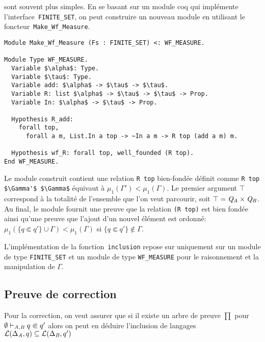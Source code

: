 sont souvent plus simples.
En se basant sur un module coq qui implémente l'interface~\lstinline!FINITE_SET!, on peut construire un nouveau module
en utilisant le foncteur~\lstinline!Make_Wf_Measure!.
\begin{lstlisting}
Module Make_Wf_Measure (Fs : FINITE_SET) <: WF_MEASURE.

Module Type WF_MEASURE.
  Variable $\alpha$: Type.
  Variable $\tau$: Type.
  Variable add: $\alpha$ -> $\tau$ -> $\tau$.
  Variable R: list $\alpha$ -> $\tau$ -> $\tau$ -> Prop.
  Variable In: $\alpha$ -> $\tau$ -> Prop.

  Hypothesis R_add:
    forall top,
      forall a m, List.In a top -> ~In a m -> R top (add a m) m.

  Hypothesis wf_R: forall top, well_founded (R top).
End WF_MEASURE.
\end{lstlisting}
Le module construit contient une relation \lstinline!R top! bien-fondée 
définit comme \lstinline!R top $\Gamma'$ $\Gamma$! équivaut à $\mu_1(\Gamma') < \mu_1(\Gamma)$.
Le premier argument $\top$ correspond à la totalité de l'ensemble que l'on veut parcourir,
soit $\top = \mathit Q_\mathit A \times \mathit Q_\mathit B$. Au final, le module fournit une preuve que la relation 
\lstinline!(R top)! est bien fondée ainsi qu'une preuve que l'ajout d'un nouvel élément 
est ordonné: $\mu_1(\{q \Subset q'\} \cup \Gamma) < \mu_1(\Gamma)$ si $\{q \Subset q'\} \not\in \Gamma$.

L'implémentation de la fonction~\lstinline!inclusion! repose sur uniquement sur un module de type
\lstinline!FINITE_SET! et un module de type \lstinline!WF_MEASURE! pour le raisonnement et
la manipulation de $\Gamma$.



\subsection{Preuve de correction}
\label{sec:correction}

Pour la correction, on veut assurer que si il existe un arbre de preuve $\prod$
pour $\emptyset \vdash_{\mathit A, \mathit B} q \Subset q'$ alors on peut en déduire l'inclusion de langages
$\mathcal{L}(\Delta_\mathit A, q) \subseteq \mathcal{L}(\Delta_\mathit B, q')$


